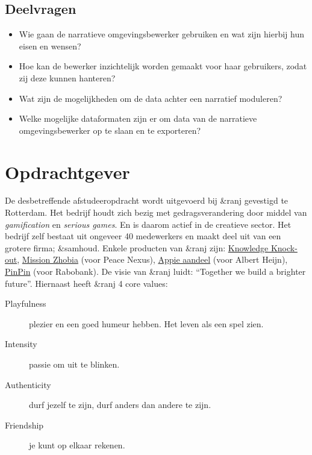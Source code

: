 \documentclass{report}
\newcommand{\organisation}{\&ranj }
\begin{document}
\subsection{Deelvragen}
\begin{itemize}
\item Wie gaan de narratieve omgevingsbewerker gebruiken en wat zijn hierbij hun eisen en wensen?
\item Hoe kan de bewerker inzichtelijk worden gemaakt voor haar gebruikers, zodat zij deze kunnen hanteren?
\item Wat zijn de mogelijkheden om de data achter een narratief moduleren?
\item Welke mogelijke dataformaten zijn er om data van de narratieve omgevingsbewerker op te slaan en te exporteren?
\end{itemize}

\section{Opdrachtgever}
De desbetreffende afstudeeropdracht wordt uitgevoerd bij \organisation gevestigd te Rotterdam. Het bedrijf houdt zich bezig met gedragsverandering door middel van \emph{gamification} en \emph{serious games}. En is daarom actief in de creatieve sector.
Het bedrijf zelf bestaat uit ongeveer 40 medewerkers en maakt deel uit van een grotere firma; \&samhoud. Enkele producten van \organisation zijn: \href{https://ranj.com/products#knowledge-knock-out}{Knowledge Knock-out}, \href{https://ranj.com/projects/corporate/development#mission-zhobia}{Mission Zhobia} (voor Peace Nexus), \href{https://ranj.com/projects/corporate/development#appie-aandeel}{Appie aandeel} (voor Albert Heijn), \href{https://ranj.com/projects/education#pinpin}{PinPin} (voor Rabobank).
De visie van \organisation luidt: ``Together we build a brighter future''.
Hiernaast heeft \organisation 4 core values:
\begin{description}
\item[Playfulness] plezier en een goed humeur hebben. Het leven als een spel zien.
\item[Intensity] passie om uit te blinken.
\item[Authenticity] durf jezelf te zijn, durf anders dan andere te zijn.
\item[Friendship] je kunt op elkaar rekenen.
\end{description}
\end{document}
